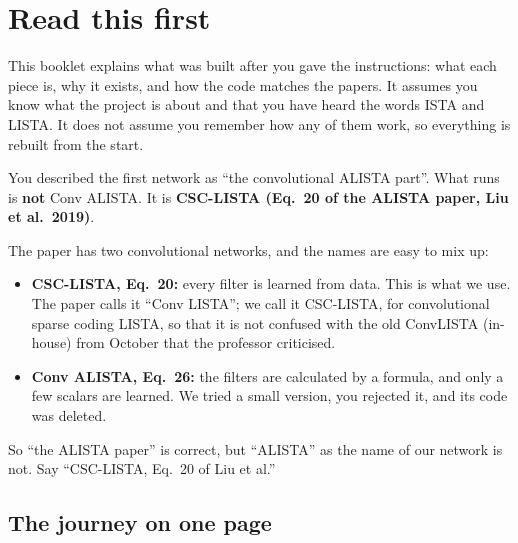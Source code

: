\chapter{Read this first}

This booklet explains what was built after you gave the instructions: what each piece is,
why it exists, and how the code matches the papers. It assumes you know what the project is
about and that you have heard the words ISTA and LISTA. It does not assume you remember how
any of them work, so everything is rebuilt from the start.

\begin{careful}
You described the first network as ``the convolutional ALISTA part''. What runs is
\textbf{not} Conv ALISTA. It is \textbf{CSC-LISTA (Eq.~20 of the ALISTA paper, Liu et al.\ 2019)}.

The paper has two convolutional networks, and the names are easy to mix up:
\begin{itemize}
\item \textbf{CSC-LISTA, Eq.~20:} every filter is learned from data. This is what we use. The paper
calls it ``Conv LISTA''; we call it CSC-LISTA, for convolutional sparse coding LISTA, so that it is not
confused with the old ConvLISTA (in-house) from October that the professor criticised.
\item \textbf{Conv ALISTA, Eq.~26:} the filters are calculated by a formula, and only a few
scalars are learned. We tried a small version, you rejected it, and its code was deleted.
\end{itemize}
So ``the ALISTA paper'' is correct, but ``ALISTA'' as the name of our network is not. Say
``CSC-LISTA, Eq.~20 of Liu et al.''
\end{careful}

\section*{The journey on one page}


